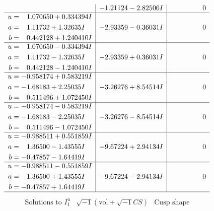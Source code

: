 \documentclass[1p]{elsarticle_modified}
\theoremstyle{definition}
\newcommand{\I}{\sqrt{-1}}
\begin{document}
$$\begin{array}{c|c|c}
 & -1.21124 - 2.82506 I & \phantom{-0.000000 } 0 \\ \hline\begin{aligned}
u &= \phantom{-}1.070650 + 0.334394 I \\
a &= \phantom{-}1.11732 + 1.32635 I \\
b &= \phantom{-}0.442128 + 1.240410 I\end{aligned}
 & -2.93359 - 0.36031 I & \phantom{-0.000000 } 0 \\ \hline\begin{aligned}
u &= \phantom{-}1.070650 - 0.334394 I \\
a &= \phantom{-}1.11732 - 1.32635 I \\
b &= \phantom{-}0.442128 - 1.240410 I\end{aligned}
 & -2.93359 + 0.36031 I & \phantom{-0.000000 } 0 \\ \hline\begin{aligned}
u &= -0.958174 + 0.583219 I \\
a &= -1.68183 + 2.25035 I \\
b &= \phantom{-}0.511496 + 1.072450 I\end{aligned}
 & -3.26276 + 8.54514 I & \phantom{-0.000000 } 0 \\ \hline\begin{aligned}
u &= -0.958174 - 0.583219 I \\
a &= -1.68183 - 2.25035 I \\
b &= \phantom{-}0.511496 - 1.072450 I\end{aligned}
 & -3.26276 - 8.54514 I & \phantom{-0.000000 } 0 \\ \hline\begin{aligned}
u &= -0.988511 + 0.551859 I \\
a &= \phantom{-}1.36500 - 1.43555 I \\
b &= -0.47857 - 1.64419 I\end{aligned}
 & -9.67224 + 2.94134 I & \phantom{-0.000000 } 0 \\ \hline\begin{aligned}
u &= -0.988511 - 0.551859 I \\
a &= \phantom{-}1.36500 + 1.43555 I \\
b &= -0.47857 + 1.64419 I\end{aligned}
 & -9.67224 - 2.94134 I & \phantom{-0.000000 } 0\\
 \hline 
 \end{array}$$\newpage$$\begin{array}{c|c|c}  
\text{Solutions to }I^u_{1}& \I (\text{vol} + \sqrt{-1}CS) & \text{Cusp shape}\\

\end{array}$$
\end{document}
